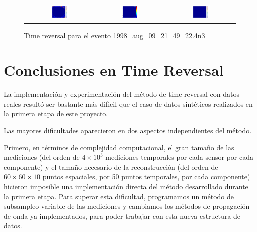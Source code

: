 \begin{figure}[H]
\begin{tabular}{ccc}
	\includegraphics[width=0.3\textwidth]{linea_timerev/figuras/timereversal/ev3/tr336.png}&
	\includegraphics[width=0.3\textwidth]{linea_timerev/figuras/timereversal/ev3/tr337.png}&
	\includegraphics[width=0.3\textwidth]{linea_timerev/figuras/timereversal/ev3/tr338.png}\\
\end{tabular}
\caption{Time reversal para el evento 1998\_aug\_09\_21\_49\_22.4n3}
\end{figure}


\section{Conclusiones en Time Reversal}

La implementaci\'on y experimentaci\'on del m\'etodo de time reversal con datos reales
result\'o ser bastante m\'as dif\'{\i}cil que el caso de datos sint\'eticos realizados en
la primera etapa de este proyecto.

Las mayores dificultades aparecieron en dos aspectos independientes
del m\'etodo.

Primero, en t\'erminos de complejidad computacional, el gran tama\~no de las
mediciones (del orden de $4\times10^3$ mediciones temporales por cada sensor
por cada componente) y el tama\~no necesario de la reconstrucci\'on
(del orden de $60\times60\times10$ puntos espaciales, por 50 puntos temporales,
por cada componente) hicieron imposible una implementaci\'on directa del m\'etodo
desarrollado durante la primera etapa.
Para superar esta dificultad, programamos un m\'etodo de subsampleo variable de las
mediciones y cambiamos los m\'etodos de propagaci\'on de onda ya implementados, para
poder trabajar con esta nueva estructura de datos.

